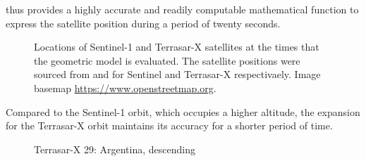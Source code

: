 \par
{} thus provides a highly accurate and readily computable mathematical function to express the satellite position during a period of twenty seconds. 
\begin{figure}
	\caption{Locations of Sentinel-1 and Terrasar-X  satellites at the times that the geometric model is evaluated. The satellite positions were sourced from \cite{SentinelPOD} and \cite{GFZ} for Sentinel and Terrasar-X respectivaely. Image basemap \textcopyright \url{https://www.openstreetmap.org}.}
	\label{fg:orbitMap}
\end{figure}
Compared to the Sentinel-1 orbit, which occupies a higher altitude, the expansion for the Terrasar-X orbit maintains its accuracy for a shorter period of time.
\begin{figure}[ht]
\begin{subfigure}{.5\textwidth}
  \resizebox{\textwidth}{!}{}
  \label{fg:29a}
\end{subfigure}
\begin{subfigure}{.5\textwidth}
  \resizebox{\textwidth}{!}{} 
  \label{fg:29b}
\end{subfigure} 
\caption{Terrasar-X 29: Argentina, descending}
\label{fg:29}
\end{figure}
